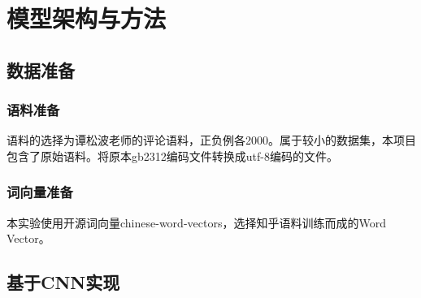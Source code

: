 \section{模型架构与方法}
\subsection{数据准备}
\subsubsection{语料准备}

语料的选择为谭松波老师的评论语料\cite{hotel-comment}，正负例各2000。属于较小的数据集，本项目包含了原始语料。将原本gb2312编码文件转换成utf-8编码的文件。

\subsubsection{词向量准备}

本实验使用开源词向量chinese-word-vectors\cite{P18-2023}，选择知乎语料训练而成的Word Vector。

\subsection{基于CNN实现}
